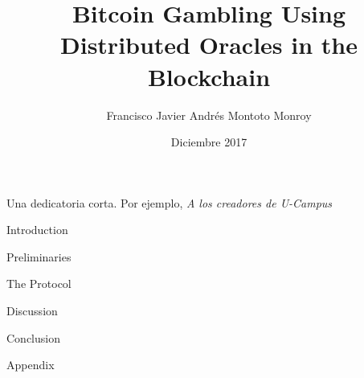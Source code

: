 \documentclass[upright, contnum]{umemoria}
\author{Francisco Javier Andr\'es Montoto Monroy}
\title{Bitcoin Gambling Using Distributed Oracles in the Blockchain}
\date{Diciembre 2017}
\begin{document}
\frontmatter
\maketitle

\begin{abstract}
	
\end{abstract}

\begin{dedicatoria} %
	Una dedicatoria corta. Por ejemplo, \emph{A los creadores de U-Campus}
\end{dedicatoria}

\begin{thanks} %
	\lipsum[1-2]
\end{thanks}
\cleardoublepage
{}
\tableofcontents
\listoftables %
\listoffigures %

\mainmatter

\begin{my_section}{Introduction}
	
\end{my_section}

\begin{my_section}{Preliminaries}
	
	
	
	
	
\end{my_section}

\begin{my_section}{The Protocol}
    
	
	
	
	
    
	
    
\end{my_section}

\begin{my_section}{Discussion}
	
    
    
    
    
\end{my_section}

\begin{my_section}{Conclusion}
	
\end{my_section}

\printbibliography

\begin{my_section}{Appendix}
    
\end{my_section}
\end{document}
